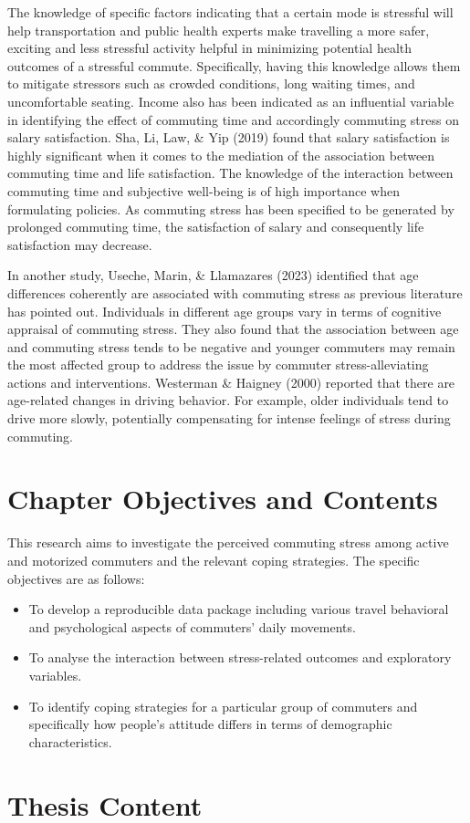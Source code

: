 \documentclass[
11pt, %
oneside, %
english, %
singlespacing, %
]{macthesis} %
\begin{document}
The knowledge of specific factors indicating that a certain mode is stressful will help transportation and public health experts make travelling a more safer, exciting and less stressful activity helpful in minimizing potential health outcomes of a stressful commute. Specifically, having this knowledge allows them to mitigate stressors such as crowded conditions, long waiting times, and uncomfortable seating. Income also has been indicated as an influential variable in identifying the effect of commuting time and accordingly commuting stress on salary satisfaction. Sha, Li, Law, \& Yip (2019) found that salary satisfaction is highly significant when it comes to the mediation of the association between commuting time and life satisfaction. The knowledge of the interaction between commuting time and subjective well-being is of high importance when formulating policies. As commuting stress has been specified to be generated by prolonged commuting time, the satisfaction of salary and consequently life satisfaction may decrease.

In another study, Useche, Marin, \& Llamazares (2023) identified that age differences coherently are associated with commuting stress as previous literature has pointed out. Individuals in different age groups vary in terms of cognitive appraisal of commuting stress. They also found that the association between age and commuting stress tends to be negative and younger commuters may remain the most affected group to address the issue by commuter stress-alleviating actions and interventions. Westerman \& Haigney (2000) reported that there are age-related changes in driving behavior. For example, older individuals tend to drive more slowly, potentially compensating for intense feelings of stress during commuting.

\hypertarget{chapter-objectives-and-contents}{%
\section{Chapter Objectives and Contents}\label{chapter-objectives-and-contents}}

This research aims to investigate the perceived commuting stress among active and motorized commuters and the relevant coping strategies. The specific objectives are as follows:
\begin{itemize}
\item
  To develop a reproducible data package including various travel behavioral and psychological aspects of commuters' daily movements.
\item
  To analyse the interaction between stress-related outcomes and exploratory variables.
\item
  To identify coping strategies for a particular group of commuters and specifically how people's attitude differs in terms of demographic characteristics.
\end{itemize}
\hypertarget{thesis-content}{%
\section{Thesis Content}\label{thesis-content}}
\end{document}
